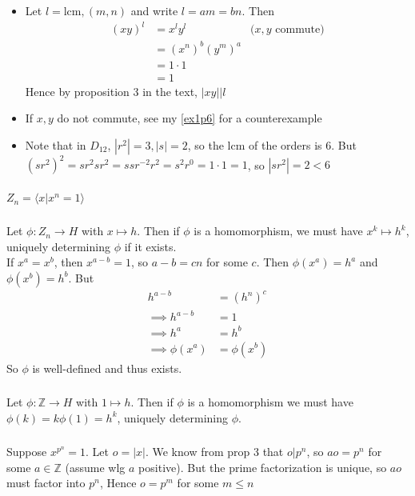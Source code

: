 \documentclass{article}
\newcommand{\ints}{\mathbb{Z}}
\newcommand{\lcm}{ \textrm{lcm}, }
\newcommand{\norm}[1]{|#1|}
\newcommand{\divides}{\big\vert}
\newcommand{\cyclic}[1]{\langle#1\rangle}
\begin{document}
\subsubsection{}\label{ex3p16}
\begin{itemize}
\item Let $l = \lcm(m,n)$ and write $l=am=bn$. Then
\begin{align*}
(xy)^l &= x^ly^l & \mbox{($x,y$ commute)}\\
&= (x^n)^b(y^m)^a\\
&= 1\cdot 1\\
&= 1
\end{align*}
Hence by proposition 3 in the text, $\norm{xy} \divides l$
\item If $x,y$ do not commute, see my \ref{ex1p6} for a counterexample
\item Note that in $D_{12}$, $\norm{r^2} = 3, \norm{s}=2$, so the lcm of the orders is $6$. But $(sr^2)^2 = sr^2sr^2 = ssr^{-2}r^2 = s^2r^0 = 1\cdot 1 = 1$, so $\norm{sr^2} = 2 < 6$
\end{itemize}
\subsubsection{}\label{ex3p17}
$Z_n = \cyclic{x | x^n=1 }$
\subsubsection{}\label{ex3p18}
Let $\phi: Z_n \to H$ with $x \mapsto h$. Then if $\phi$ is a homomorphism, we must have $x^k \mapsto h^k$, uniquely determining $\phi$ if it exists.\\
If $x^a = x^b$, then $x^{a-b}=1$, so $a-b=cn$ for some $c$. Then $\phi(x^a)=h^a$ and $\phi(x^b)=h^b$. But 
\begin{align*}
h^{a-b} &= (h^n)^c\\
\implies h^{a-b} &= 1\\
\implies h^a &= h^b\\
\implies \phi(x^a) &= \phi(x^b)
\end{align*}
So $\phi$ is well-defined and thus exists.
\subsubsection{}\label{ex3p19}
Let $\phi: \ints \to H$ with $1\mapsto h$. Then if $\phi$ is a homomorphism we must have $\phi(k)=k\phi(1)=h^k$, uniquely determining $\phi$.
\subsubsection{}\label{ex3p20}
Suppose $x^{p^n} = 1$. Let $o=\norm{x}$. We know from prop 3 that $o \divides p^n$, so $ao = p^n$ for some $a \in \ints$ (assume wlg $a$ positive). But the prime factorization is unique, so $ao$ must factor into $p^n$, Hence $o=p^m$ for some $m\leq n$
\end{document}
